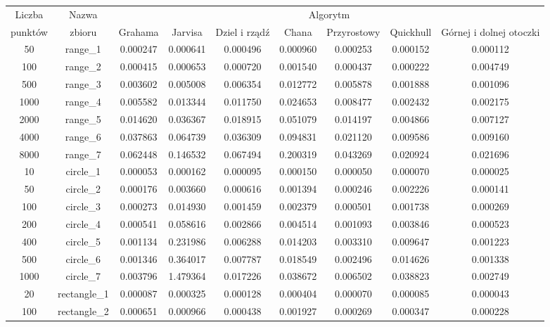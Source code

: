 \documentclass[a4paper,11pt]{article}
\begin{document}
\begin{center}
\begin{table}[h]
\scriptsize
\begin{tabular}{|c|c|c|c|c|c|c|c|c|}
\hline
 Liczba & Nazwa & \multicolumn{7}{c|}{ Algorytm } \\ \cline{3-9}
punktów & zbioru & Grahama & Jarvisa & Dziel i rządź & Chana & Przyrostowy & Quickhull & Górnej i dolnej otoczki \\ \hline
50 & range_1 & 0.000247 & 0.000641 & 0.000496 & 0.000960 & 0.000253 & 0.000152 & 0.000112 \\
100 & range_2 & 0.000415 & 0.000653 & 0.000720 & 0.001540 & 0.000437 & 0.000222 & 0.004749 \\
500 & range_3 & 0.003602 & 0.005008 & 0.006354 & 0.012772 & 0.005878 & 0.001888 & 0.001096 \\ 
1000 & range_4 & 0.005582 & 0.013344 & 0.011750 & 0.024653 & 0.008477 & 0.002432 & 0.002175 \\ 
2000 & range_5 & 0.014620 & 0.036367 & 0.018915 & 0.051079 & 0.014197 & 0.004866 & 0.007127 \\
4000 & range_6 & 0.037863 & 0.064739 & 0.036309 & 0.094831 & 0.021120 & 0.009586 & 0.009160 \\
8000 & range_7 & 0.062448 & 0.146532 & 0.067494 & 0.200319 & 0.043269 & 0.020924 & 0.021696 \\
10 & circle_1 & 0.000053 & 0.000162 & 0.000095 & 0.000150 & 0.000050 & 0.000070 & 0.000025 \\ 
50 & circle_2 & 0.000176 & 0.003660 & 0.000616 & 0.001394 & 0.000246 & 0.002226 & 0.000141 \\
100 & circle_3 & 0.000273 & 0.014930 & 0.001459 & 0.002379 & 0.000501 & 0.001738 & 0.000269 \\
200 & circle_4 & 0.000541 & 0.058616 & 0.002866 & 0.004514 & 0.001093 & 0.003846 & 0.000523 \\
400 & circle_5 & 0.001134 & 0.231986 & 0.006288 & 0.014203 & 0.003310 & 0.009647 & 0.001223 \\ 
500 & circle_6 & 0.001346 & 0.364017 & 0.007787 & 0.018549 & 0.002496 & 0.014626 & 0.001338 \\
1000 & circle_7 & 0.003796 & 1.479364 & 0.017226 & 0.038672 & 0.006502 & 0.038823 & 0.002749 \\
20 & rectangle_1 & 0.000087 & 0.000325 & 0.000128 & 0.000404 & 0.000070 & 0.000085 & 0.000043 \\
100 & rectangle_2 & 0.000651 & 0.000966 & 0.000438 & 0.001927 & 0.000269 & 0.000347 & 0.000228 \\

\end{tabular}
\end{table}
\end{center}
\end{document}
